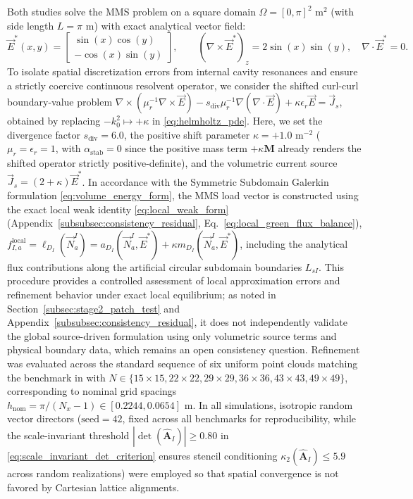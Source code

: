 \documentclass[VANCOUVER,Times1COL]{WileyNJD-v5}
\begin{document}
Both studies solve the MMS problem on a square domain $\Omega = [0, \pi]^2\text{ m}^2$ (with side length $L = \pi\text{ m}$) with exact analytical vector field:
\begin{equation}
    \vec{E}^*(x, y) = \begin{bmatrix} \sin(x) \cos(y) \\ -\cos(x) \sin(y) \end{bmatrix}, \qquad (\nabla \times \vec{E}^*)_z = 2\sin(x)\sin(y), \quad \nabla \cdot \vec{E}^* = 0.
\end{equation}
To isolate spatial discretization errors from internal cavity resonances and ensure a strictly coercive continuous resolvent operator, we consider the shifted curl-curl boundary-value problem $\nabla \times (\mu_r^{-1} \nabla \times \vec{E}) - s_{\mathrm{div}} \mu_r^{-1} \nabla(\nabla \cdot \vec{E}) + \kappa \epsilon_r \vec{E} = \vec{J}_s$, obtained by replacing $-k_0^2 \mapsto +\kappa$ in \eqref{eq:helmholtz_pde}. Here, we set the divergence factor $s_{\mathrm{div}} = 6.0$, the positive shift parameter $\kappa = +1.0\text{ m}^{-2}$ ($\mu_r = \epsilon_r = 1$, with $\alpha_{\mathrm{stab}} = 0$ since the positive mass term $+\kappa\mathbf{M}$ already renders the shifted operator strictly positive-definite), and the volumetric current source $\vec{J}_s = (2 + \kappa) \vec{E}^*$. In accordance with the Symmetric Subdomain Galerkin formulation \eqref{eq:volume_energy_form}, the MMS load vector is constructed using the exact local weak identity \eqref{eq:local_weak_form} (Appendix~\ref{subsubsec:consistency_residual}, Eq.~\eqref{eq:local_green_flux_balance}), $f_{I, a}^{\mathrm{local}} = \ell_{D_I}(\vec{N}_a^I) = a_{D_I}(\vec{N}_a^I, \vec{E}^*) + \kappa m_{D_I}(\vec{N}_a^I, \vec{E}^*)$, including the analytical flux contributions along the artificial circular subdomain boundaries $L_{sI}$. This procedure provides a controlled assessment of local approximation errors and refinement behavior under exact local equilibrium; as noted in Section~\ref{subsec:stage2_patch_test} and Appendix~\ref{subsubsec:consistency_residual}, it does not independently validate the global source-driven formulation using only volumetric source terms and physical boundary data, which remains an open consistency question. Refinement was evaluated across the standard sequence of six uniform point clouds matching the benchmark in \cite{stable_vnmm2d_2026} with $N \in \{15 \times 15, 22 \times 22, 29 \times 29, 36 \times 36, 43 \times 43, 49 \times 49\}$, corresponding to nominal grid spacings $h_{\mathrm{nom}} = \pi/(N_x-1) \in [0.2244, 0.0654]\text{ m}$. In all simulations, isotropic random vector directors ($\text{seed}=42$, fixed across all benchmarks for reproducibility, while the scale-invariant threshold $|\det(\widehat{\mathbf{A}}_I)| \ge 0.80$ in \eqref{eq:scale_invariant_det_criterion} ensures stencil conditioning $\kappa_2(\widehat{\mathbf{A}}_I) \le 5.9$ across random realizations) were employed so that spatial convergence is not favored by Cartesian lattice alignments.
\end{document}
